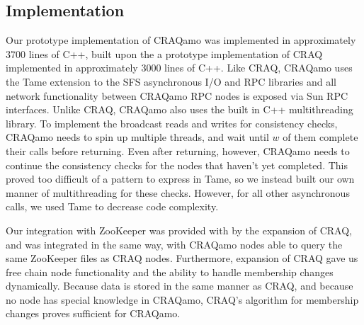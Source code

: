 \subsection{Implementation}
Our prototype implementation of CRAQamo was implemented in approximately 3700 lines of C++,
built upon the a prototype implementation of CRAQ implemented in approximately 3000 lines of C++.
Like CRAQ, CRAQamo uses the Tame \cite{tame} extension to the SFS asynchronous I/O and RPC libraries \cite{sfs} and all network functionality between CRAQamo RPC nodes is exposed via Sun RPC interfaces.
Unlike CRAQ, CRAQamo also uses the built in C++ multithreading library.
To implement the broadcast reads and writes for consistency checks, CRAQamo needs to spin up multiple threads, and wait until $w$ of them complete their calls before returning.
Even after returning, however, CRAQamo needs to continue the consistency checks for the nodes that haven't yet completed.
This proved too difficult of a pattern to express in Tame, so we instead built our own manner of multithreading for these checks.
However, for all other asynchronous calls, we used Tame to decrease code complexity.

Our integration with ZooKeeper was provided with by the expansion of CRAQ, and was integrated in the same way, with CRAQamo nodes able to query the same ZooKeeper files as CRAQ nodes.
Furthermore, expansion of CRAQ gave us free chain node functionality and the ability to handle membership changes dynamically.
Because data is stored in the same manner as CRAQ, and because no node has special knowledge in CRAQamo, CRAQ's algorithm for membership changes proves sufficient for CRAQamo.

